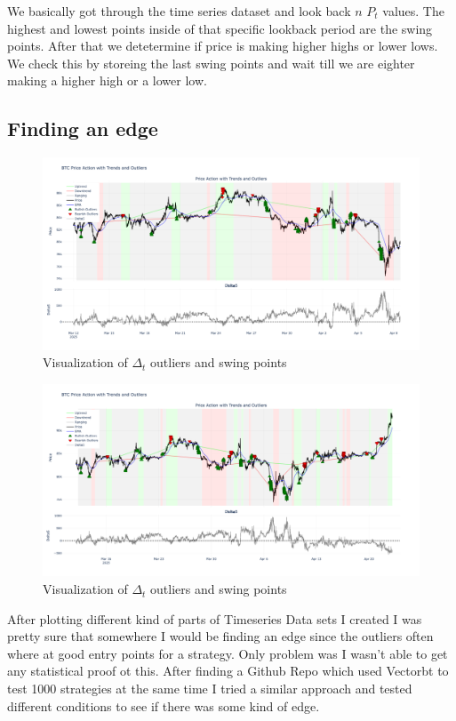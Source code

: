 \documentclass[12pt]{article}
\begin{document}
We basically got through the time series dataset and look back $n$ $P_t$ values. The highest and lowest points inside of that specific lookback period are the swing points. After that we detetermine if price is making higher highs or lower lows. We check this by storeing the last swing points and wait till we are eighter making a higher high or a lower low.



\subsection*{Finding an edge}

\begin{figure}[H]
  \centering
  \includegraphics[width=\textwidth]{imgs/plotting_of_my_idea.png}
  \caption{Visualization of $\Delta_t$ outliers and swing points}
\end{figure}
\begin{figure}[H]
  \centering
  \includegraphics[width=\textwidth]{imgs/v2_plotting my idea.png}
  \caption{Visualization of $\Delta_t$ outliers and swing points}
\end{figure}

After plotting different kind of parts of Timeseries Data sets I created I was pretty sure that somewhere I would be finding an edge since the outliers often where at good entry points for a strategy. Only problem was I wasn't able to get any statistical proof ot this.
After finding a Github Repo which used Vectorbt to test 1000 strategies at the same time I tried a similar approach and tested different conditions to see if there was some kind of edge.
\end{document}

